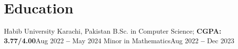 \section{Education}
\vspace{3pt}
\resumeSubHeadingListStart

\resumeEducationHeading
{Habib University
}{Karachi, Pakistan}
{B.Sc. in Computer Science; \textbf{CGPA: 3.77/4.00}}{Aug 2022 \textbf{--} May 2024}
{Minor in Mathematics}{Aug 2022 \textbf{--} Dec 2023}



\resumeSubHeadingListEnd
